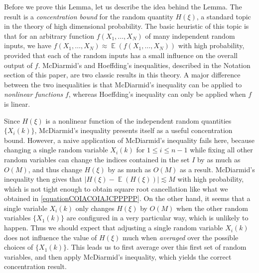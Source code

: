 \documentclass[dvipsnames,letterpaper,12pt]{article}
\numberwithin{equation}{section}
\numberwithin{theorem}{section}
\DeclareMathOperator{\EE}{\mathbb{E}}
\begin{document}
Before we prove this Lemma, let us describe the idea behind the Lemma. The result is a \emph{concentration bound} for the random quantity $H(\xi)$, a standard topic in the theory of high dimensional probability. The basic heuristic of this topic is that for an arbitrary function $f(X_1,\dots,X_N)$ of many independent random inputs, we have $f(X_1,\dots,X_N) \approx \EE(f(X_1,\dots,X_N))$ with high probability, provided that each of the random inputs has a small influence on the overall output of $f$. McDiarmid's and Hoeffding's inequalities, described in the Notation section of this paper, are two classic results in this theory. A major difference between the two inequalities is that McDiarmid's inequality can be applied to \emph{nonlinear functions} $f$, whereas Hoeffding's inequality can only be applied when $f$ is linear.

Since $H(\xi)$ is a nonlinear function of the independent random quantities $\{ X_i(k) \}$, McDiarmid's inequality presents itself as a useful concentration bound. However, a naive application of McDiarmid's inequality fails here, because changing a single random variable $X_i(k)$ for $1 \leq i \leq n-1$ while fixing all other random variables can change the indices contained in the set $I$ by as much as $O(M)$, and thus change $H(\xi)$ by as much as $O(M)$ as a result. McDiarmid's inequality then gives that $|H(\xi) - \EE(H(\xi))| \lesssim M$ with high probability, which is not tight enough to obtain square root cancellation like what we obtained in \eqref{equationCOIACOIAJCPPPPP}. On the other hand, it seems that a single variable $X_i(k)$ only changes $H(\xi)$ by $O(M)$ when the other random variables $\{ X_1(k) \}$ are configured in a very particular way, which is unlikely to happen. Thus we should expect that adjusting a single random variable $X_i(k)$ does not influence the value of $H(\xi)$ much when \emph{averaged} over the possible choices of $\{ X_1(k) \}$. This leads us to first average over this first set of random variables, and then apply McDiarmid's inequality, which yields the correct concentration result.
\end{document}
